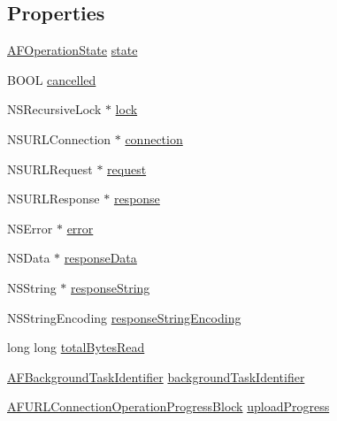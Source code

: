 \subsection*{Properties}
\begin{DoxyCompactItemize}
\item 
\hyperlink{_a_f_u_r_l_connection_operation_8m_a51bbe4980aae3bad31c2b5de2b9563d4}{A\-F\-Operation\-State} \hyperlink{category_a_f_u_r_l_connection_operation_07_08_a6a1365f049676a63b618117ebbf066e5}{state}
\item 
B\-O\-O\-L \hyperlink{category_a_f_u_r_l_connection_operation_07_08_abd52a89a1517491adc621c826aaf32ed}{cancelled}
\item 
N\-S\-Recursive\-Lock $\ast$ \hyperlink{category_a_f_u_r_l_connection_operation_07_08_af005a048794e23d1771fe4cec2570e41}{lock}
\item 
N\-S\-U\-R\-L\-Connection $\ast$ \hyperlink{category_a_f_u_r_l_connection_operation_07_08_afcdbf96684b53cfe015b4adfd02bdc9d}{connection}
\item 
N\-S\-U\-R\-L\-Request $\ast$ \hyperlink{category_a_f_u_r_l_connection_operation_07_08_a8ca07904883feeb654514635c90e8c90}{request}
\item 
N\-S\-U\-R\-L\-Response $\ast$ \hyperlink{category_a_f_u_r_l_connection_operation_07_08_a30c553a8c76e1a6b76dd50046bb4ca4d}{response}
\item 
N\-S\-Error $\ast$ \hyperlink{category_a_f_u_r_l_connection_operation_07_08_a31d7cc5feb03df3db5352d4a661319a1}{error}
\item 
N\-S\-Data $\ast$ \hyperlink{category_a_f_u_r_l_connection_operation_07_08_acde74446f0be79bd58dea7d000ffee34}{response\-Data}
\item 
N\-S\-String $\ast$ \hyperlink{category_a_f_u_r_l_connection_operation_07_08_ae6f761b07b09eaeca5d0ef158b494e7e}{response\-String}
\item 
N\-S\-String\-Encoding \hyperlink{category_a_f_u_r_l_connection_operation_07_08_a4fd7b6c934c563e034e45d34ad77b7c4}{response\-String\-Encoding}
\item 
long long \hyperlink{category_a_f_u_r_l_connection_operation_07_08_a08a500031a7a4cd7cfa97f041b471a31}{total\-Bytes\-Read}
\item 
\hyperlink{_a_f_u_r_l_connection_operation_8m_ae158f01d5331666b5ea61d9708f696bd}{A\-F\-Background\-Task\-Identifier} \hyperlink{category_a_f_u_r_l_connection_operation_07_08_af0838eb9c35354325d7e67e9168a674c}{background\-Task\-Identifier}
\item 
\hyperlink{_a_f_u_r_l_connection_operation_8m_a8522dd3ddf39be65563f1225357677d0}{A\-F\-U\-R\-L\-Connection\-Operation\-Progress\-Block} \hyperlink{category_a_f_u_r_l_connection_operation_07_08_afe3a5f549dbbda0c5706cd6d7da0590d}{upload\-Progress}

\end{DoxyCompactItemize}
